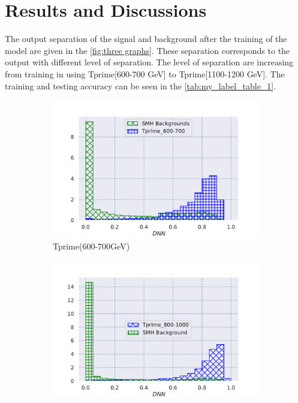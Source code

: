 \chapter{\label{R_D}Results and Discussions}
The output separation of the signal and background after the training of the model are given in the \autoref{fig:three graphs}. These separation corresponds to the output with different level of separation. The level of separation are increasing from training in using Tprime[600-700 GeV] to  Tprime[1100-1200 GeV]. The training and testing accuracy can be seen in the \autoref{tab:my_label_table_1}.

\begin{figure}[H]
     \centering
     \begin{subfigure}[b]{0.47\textwidth}
         \centering
         \includegraphics[width=\textwidth]{figure_4/output_TPrime600-700_on_testing_all_background.pdf}
         \caption{Tprime(600-700GeV)}
         \label{fig:y equals x}
     \end{subfigure}
     \hfill
     \begin{subfigure}[b]{0.47\textwidth}
         \centering
         \includegraphics[width=\textwidth]{figure_4/output_TPrime800-1000_on_testing_all_background.pdf}

\end{subfigure}
\end{figure}
